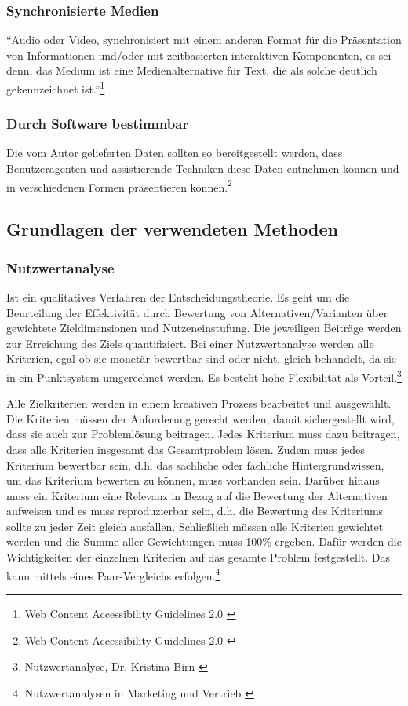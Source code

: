 \subsubsection{Synchronisierte Medien}
"`Audio oder Video, synchronisiert mit einem anderen Format für die Präsentation von Informationen und/oder mit zeitbasierten interaktiven 
Komponenten, es sei denn, das Medium ist eine Medienalternative für Text, die als solche deutlich gekennzeichnet 
ist."'\footnote{Web Content Accessibility Guidelines 2.0 \cite{WCAG2.0}}

\subsubsection{Durch Software bestimmbar}
Die vom Autor gelieferten Daten sollten so bereitgestellt werden, dass Benutzeragenten und assistierende Techniken diese Daten entnehmen können und in verschiedenen
Formen präsentieren können.\footnote{Web Content Accessibility Guidelines 2.0 \cite{WCAG2.0}}

\subsection{Grundlagen der verwendeten Methoden}

\subsubsection{Nutzwertanalyse}

Ist ein qualitatives Verfahren der Entscheidungstheorie. Es geht um die Beurteilung der Effektivität durch Bewertung von Alternativen/Varianten über gewichtete Zieldimensionen und Nutzeneinstufung. Die jeweiligen Beiträge werden zur Erreichung des Ziels quantifiziert. Bei einer Nutzwertanalyse werden alle Kriterien, egal ob sie monetär bewertbar sind oder nicht, gleich behandelt, da sie in ein Punktsystem umgerechnet werden. Es besteht hohe Flexibilität als Vorteil.\footnote{Nutzwertanalyse, Dr. Kristina Birn \cite{Dr.KB-Projektmanagment}}

Alle Zielkriterien werden in einem kreativen Prozess bearbeitet und ausgewählt. Die Kriterien müssen der Anforderung gerecht werden, damit sichergestellt wird, dass sie auch zur Problemlösung beitragen. Jedes Kriterium muss dazu beitragen, dass alle Kriterien insgesamt das Gesamtproblem lösen. Zudem muss jedes Kriterium bewertbar sein, d.h. das sachliche oder fachliche Hintergrundwissen, um das Kriterium bewerten zu können, muss vorhanden sein. Darüber hinaus muss ein Kriterium eine Relevanz in Bezug auf die Bewertung der Alternativen aufweisen und es muss reproduzierbar sein, d.h. die Bewertung des Kriteriums sollte zu jeder Zeit gleich ausfallen. Schließlich müssen alle Kriterien gewichtet werden und die Summe aller Gewichtungen muss 100\% ergeben. Dafür werden die Wichtigkeiten der einzelnen Kriterien auf das gesamte Problem festgestellt. Das kann mittels eines Paar-Vergleichs erfolgen.\footnote{Nutzwertanalysen in Marketing und Vertrieb \cite{kuhnapfel2014nutzwertanalysen}}

